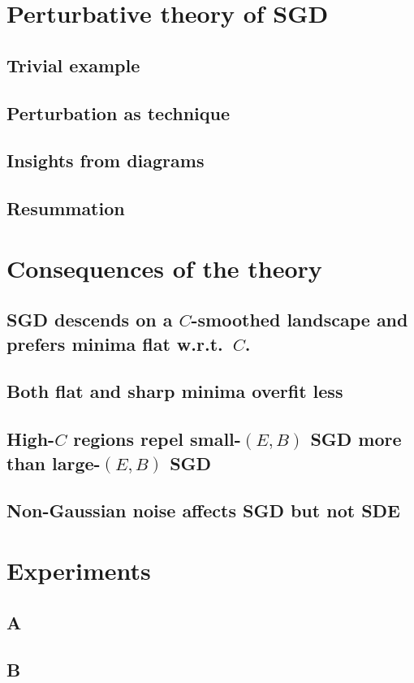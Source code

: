 \documentclass[final,12pt]{colt2021} %
\begin{document}
    \section{Perturbative theory of SGD}
        \subsection{Trivial example}
        \subsection{Perturbation as technique}
        \subsection{Insights from diagrams}
        \subsection{Resummation}
    \section{Consequences of the theory}
        \subsection{SGD descends on a $C$-smoothed landscape and prefers minima
        flat w.r.t.\ $C$.} \subsection{Both flat and sharp minima overfit less}
        \subsection{High-$C$ regions repel small-$(E,B)$ SGD more than
        large-$(E,B)$ SGD} \subsection{Non-Gaussian noise affects SGD but not
        SDE}
    \section{Experiments}
        \subsection{A}
        \subsection{B}
\end{document}
